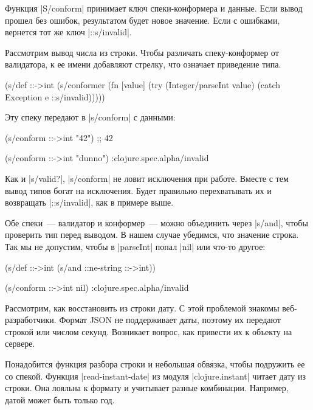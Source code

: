 Функция \spverb|S/conform| принимает ключ спеки-конформера и данные. Если вывод
прошел без ошибок, результатом будет новое значение. Если с ошибками, вернется
тот же ключ \spverb|::s/invalid|.

Рассмотрим вывод числа из строки. Чтобы различать спеку-конформер от валидатора,
к ее имени добавляют стрелку, что означает приведение типа.

\begin{english}
  \begin{clojure}
(s/def ::->int
  (s/conformer
   (fn [value]
     (try
       (Integer/parseInt value)
       (catch Exception e
         ::s/invalid)))))
  \end{clojure}
\end{english}

Эту спеку передают в \spverb|s/conform| с данными:

\begin{english}
  \begin{clojure}
(s/conform ::->int "42") ;; 42

(s/conform ::->int "dunno")
:clojure.spec.alpha/invalid
  \end{clojure}
\end{english}

Как и \spverb|s/valid?|, \spverb|s/conform| не ловит исключения при
работе. Вместе с тем вывод типов богат на исключения. Будет правильно
перехватывать их и возвращать \spverb|::s/invalid|, как в примере выше.

Обе спеки~--- валидатор и конформер~--- можно объединить через \spverb|s/and|,
чтобы проверить тип перед выводом. В нашем случае убедимся, что значение
строка. Так мы не допустим, чтобы в \spverb|parseInt| попал \spverb|nil| или
что-то другое:

\begin{english}
  \begin{clojure}
(s/def ::->int
  (s/and ::ne-string ::->int))

(s/conform ::->int nil)
:clojure.spec.alpha/invalid
  \end{clojure}
\end{english}

Рассмотрим, как восстановить из строки дату. С этой проблемой знакомы
веб-разработчики. Формат JSON не поддерживает даты, поэтому их передают строкой
или числом секунд. Возникает вопрос, как привести их к объекту на сервере.

Понадобится функция разбора строки и небольшая обвязка, чтобы подружить ее со
спекой. Функция \spverb|read-instant-date| из модуля \spverb|clojure.instant|
читает дату из строки. Она лояльна к формату и учитывает разные
комбинации. Например, датой может быть только год.

